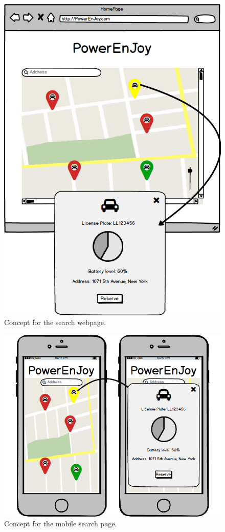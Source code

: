 \begin{figure}[H]
	\centering
	\includegraphics[width=\textwidth]{mockup/WebSearch.png}
	\caption{Concept for the search webpage.}
\end{figure}

\begin{figure}[H]
	\centering
	\includegraphics[width=\textwidth]{mockup/MobileSearch.png}
	\caption{Concept for the mobile search page.}
\end{figure}

